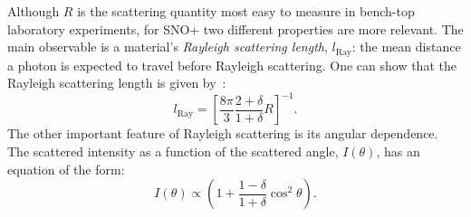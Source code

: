 Although $R$ is the scattering quantity most easy to measure in bench-top laboratory experiments, for SNO+ two different properties are more relevant. The main observable is a material's \textit{Rayleigh scattering length}, $l_{\textrm{Ray}}$: the mean distance a photon is expected to travel before Rayleigh scattering. One can show that the Rayleigh scattering length is given by~\cite{zhouRayleighScatteringLinear2015}: %
\begin{equation}
    l_{\textrm{Ray}} = \left[\frac{8\pi}{3}\frac{2+\delta}{1+\delta}R\right]^{-1}.
\end{equation}
The other important feature of Rayleigh scattering is its angular dependence. The scattered intensity as a function of the scattered angle, $I(\theta)$, has an equation of the form:
\begin{equation}
    I(\theta) \propto \left(1+\frac{1-\delta}{1+\delta}\cos^{2}\theta\right).
\end{equation}


